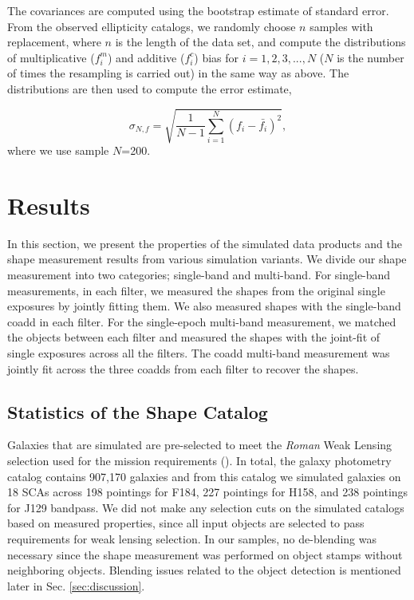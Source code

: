\documentclass[fleqn,usenatbib]{mnras}
\begin{document}
The covariances are computed using the bootstrap estimate of standard error. From the observed ellipticity catalogs, we randomly choose $n$ samples with replacement, where $n$ is the length of the data set, and compute the distributions of multiplicative ($f^{m}_{i}$) and additive ($f^{c}_{i}$) bias for $i=1,2,3,...,N$ ($N$ is the number of times the resampling is carried out) in the same way as above. The distributions are then used to compute the error estimate,  


\begin{equation}
    \sigma_{N,f} = \sqrt{\frac{1}{N-1} \sum_{i=1}^{N}(f_{i}-\bar{f_{i}})^{2}}, 
\end{equation}
where we use sample $N$=200.


\section{Results}
\label{sec:results}
In this section, we present the properties of the simulated data products and the shape measurement results from various simulation variants. We divide our shape measurement into two categories; single-band and multi-band. For single-band measurements, in each filter, we measured the shapes from the original single exposures by jointly fitting them. We also measured shapes with the single-band coadd in each filter. For the single-epoch multi-band measurement, we matched the objects between each filter and measured the shapes with the joint-fit of single exposures across all the filters. The coadd multi-band measurement was jointly fit across the three coadds from each filter to recover the shapes. 

\subsection{Statistics of the Shape Catalog}
Galaxies that are simulated are pre-selected to meet the \emph{Roman} Weak Lensing selection used for the mission requirements (\citealt{2018arXiv180403628D, 2021MNRAS.501.2044T}). In total, the galaxy photometry catalog contains 907,170 galaxies and from this catalog we simulated galaxies on 18 SCAs across 198 pointings for F184, 227 pointings for H158, and 238 pointings for J129 bandpass. We did not make any selection cuts on the simulated catalogs based on measured properties, since all input objects are selected to pass requirements for weak lensing selection. In our samples, no de-blending was necessary since the shape measurement was performed on object stamps without neighboring objects. Blending issues related to the object detection is mentioned later in Sec. \ref{sec:discussion}. 
\end{document}
